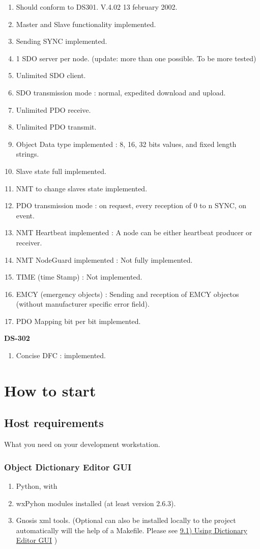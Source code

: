 \documentclass[a4paper,12pt]{book}
\newcommand\liststyleLiv{%
\renewcommand\labelitemi{{--}}
\renewcommand\labelitemii{{--}}
\renewcommand\labelitemiii{{--}}
\renewcommand\labelitemiv{{--}}
}
\newcommand\liststyleLv{%
\renewcommand\labelitemi{{--}}
\renewcommand\labelitemii{{--}}
\renewcommand\labelitemiii{{--}}
\renewcommand\labelitemiv{{--}}
}
\begin{document}
\liststyleLiv
\begin{enumerate}
\item Should conform to DS301. V.4.02 13 february 2002.
\item Master and Slave functionality implemented.
\item Sending SYNC implemented.
\item 1 SDO server per node. (update: more than one possible. To be more
tested)
\item Unlimited SDO client.
\item SDO transmission mode : normal, expedited download and upload.
\item Unlimited PDO receive.
\item Unlimited PDO transmit.
\item Object Data type implemented : 8, 16, 32 bits values, and fixed
length strings.
\item Slave state full implemented.
\item NMT to change slave{\textquotesingle}s state implemented.
\item PDO transmission mode : on request, every reception of 0 to n
SYNC, on event.
\item NMT Heartbeat implemented : A node can be either heartbeat
producer or receiver.
\item NMT NodeGuard implemented : Not fully implemented.
\item TIME (time Stamp) : Not implemented.
\item EMCY (emergency objects) : Sending and reception of EMCY objectos (without manufacturer specific error field).
\item PDO Mapping bit per bit implemented.
\end{enumerate}
{\bfseries\upshape
DS{}-302}

\liststyleLiv
\begin{enumerate}
\item Concise \space DFC : implemented.
\end{enumerate}
\section{How to start}
\subsection{Host requirements}
What you need on your development workstation.

\subsubsection{Object Dictionary Editor GUI}
\liststyleLv
\begin{enumerate}
\item Python, with 
\item wxPyhon modules installed (at least version 2.6.3). 
\item Gnosis xml tools. (Optional can also be installed locally to the
project automatically will the help of a Makefile. Please see
\hyperlink{a91UsingDictionaryEditorGUIoutline}{9.1) Using Dictionary
Editor GUI} )
\end{enumerate}
\end{document}

